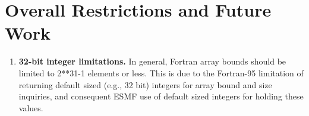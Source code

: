 
\section{Overall Restrictions and Future Work}
\label{sec:overallrest}

\begin{enumerate}

\item {\bf 32-bit integer limitations.} In general, Fortran array bounds should
be limited to 2**31-1 elements or less.  This is due to the Fortran-95
limitation of returning default sized (e.g., 32 bit) integers for array bound
and size inquiries, and consequent ESMF use of default sized integers for
holding these values.

\end{enumerate}
